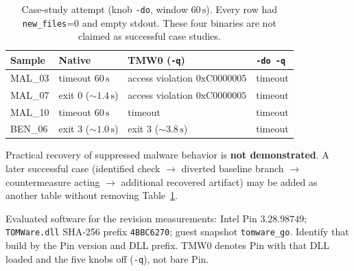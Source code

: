 \begin{table}[t]
\caption{Case-study attempt (knob \texttt{-do}, window $60\,\mathrm{s}$). Every row had \texttt{new\_files}=0 and empty stdout. These four binaries are not claimed as successful case studies.}
\label{tab:case_attempt}
\centering
\small
\begin{tabular}{llll}
\toprule
\textbf{Sample} & \textbf{Native} & \textbf{TMW0 (\texttt{-q})} & \texttt{-do -q} \\
\midrule
MAL\_03 & timeout $60\,\mathrm{s}$ & access violation $0\mathrm{xC}0000005$ & timeout \\
MAL\_07 & exit 0 ($\sim 1.4\,\mathrm{s}$) & access violation $0\mathrm{xC}0000005$ & timeout \\
MAL\_10 & timeout $60\,\mathrm{s}$ & timeout & timeout \\
BEN\_06 & exit 3 ($\sim 1.0\,\mathrm{s}$) & exit 3 ($\sim 3.8\,\mathrm{s}$) & timeout \\
\bottomrule
\end{tabular}
\end{table}

Practical recovery of suppressed malware behavior is \textbf{not demonstrated}. A later successful case (identified check $\rightarrow$ diverted baseline branch $\rightarrow$ countermeasure acting $\rightarrow$ additional recovered artifact) may be added as another table without removing Table~\ref{tab:case_attempt}.

Evaluated software for the revision measurements: Intel Pin $3.28.98749$; \texttt{TOMWare.dll} SHA-256 prefix \texttt{4BBC6270}; guest snapshot \texttt{tomware\_go}. Identify that build by the Pin version and DLL prefix. TMW0 denotes Pin with that DLL loaded and the five knobs off (\texttt{-q}), not bare Pin.


